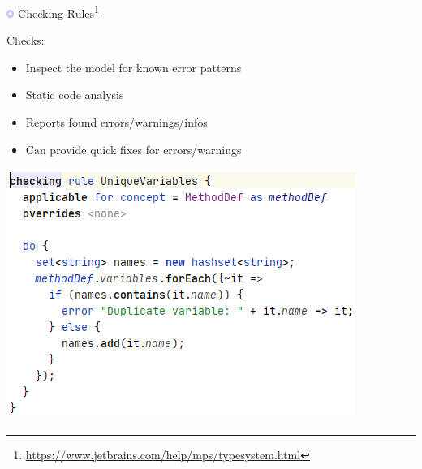 	\begin{frame}{\includegraphics[height=0.25cm]{graphics/checkingrules.png} Checking Rules\footnote{\url{https://www.jetbrains.com/help/mps/typesystem.html}}}
		\begin{minipage}{0.52\textwidth}
			Checks:
			\begin{itemize}
				\item Inspect the model for known error patterns
				\item Static code analysis
				\item Reports found errors/warnings/infos
				\item Can provide quick fixes for errors/warnings
			\end{itemize}
		\end{minipage}
		\begin{minipage}{0.4\textwidth}
			\includegraphics[height=0.8\textheight]{illustrations/check.png}
		\end{minipage}
	\end{frame}

